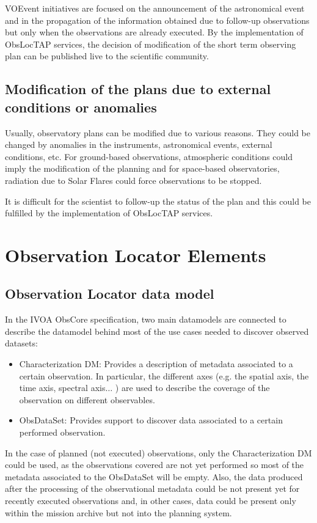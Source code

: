 \documentclass[11pt,a4paper]{ivoa}
\begin{document}
VOEvent initiatives are focused on the announcement of the astronomical event and in the propagation of the information obtained due to follow-up observations but only when the observations are already executed. By the implementation of ObsLocTAP services, the decision of modification of the short term observing plan can be published live to the scientific community.

\subsection{Modification of the plans due to external conditions or anomalies}
Usually, observatory plans can be modified due to various reasons. They could be changed by anomalies in the instruments, astronomical events, external conditions, etc. For ground-based observations, atmospheric conditions could imply the modification of the planning and for space-based observatories, radiation due to Solar Flares could force observations to be stopped.

It is difficult for the scientist to follow-up the status of the plan and this could be fulfilled by the implementation of ObsLocTAP services.

\section{Observation Locator Elements}
\subsection{Observation Locator data model }
In the IVOA ObsCore specification, two main datamodels are connected to describe the datamodel behind most of the use cases needed to discover observed datasets:

\begin{itemize}
	\item Characterization DM: Provides a description of metadata associated to a certain observation. In particular, the different axes (e.g. the spatial axis, the time axis, spectral axis$ \ldots $ ) are used to describe the coverage of the observation on different observables.
	\item ObsDataSet: Provides support to discover data associated to a certain performed observation.
\end{itemize}

In the case of planned (not executed) observations, only the Characterization DM could be used, as the observations covered are not yet performed so most of the metadata associated to the ObsDataSet will be empty. Also, the data produced after the processing of the observational metadata could be not present yet for recently executed observations and, in other cases, data could be present only within the mission archive but not into the planning system. 
\end{document}
